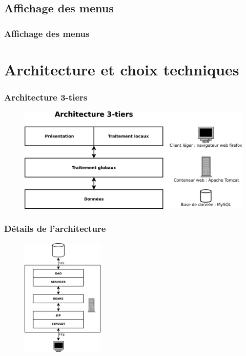 \documentclass{beamer}
\begin{document}
\subsection{Affichage des menus}
\begin{frame}
\frametitle{Affichage des menus}

\end{frame}

\section{Architecture et choix techniques}

\begin{frame}[label=Architecture 3-tiers]
  \frametitle{Architecture 3-tiers}
\begin{figure}[H]
\label{schema}
  \centering
      \includegraphics[width=1\textwidth]{architectureVitameal_3tiers.png} %
\end{figure}
\end{frame}

\begin{frame}[label=Détails de l'architecture]
  \frametitle{Détails de l'architecture}
\begin{figure}[H]
\label{schema}
  \centering
      \includegraphics[width=0.35\textwidth]{architectureVitameal_details.png} %
\end{figure}
\end{frame}
\end{document}
